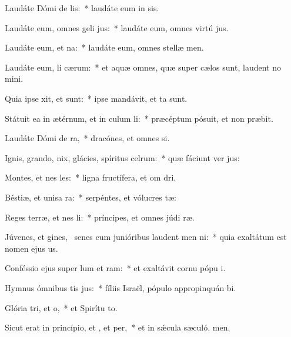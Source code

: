 \item Laudáte Dómi de lis:~* laudáte eum in sis.
\item Laudáte eum, omnes geli jus:~* laudáte eum, omnes virtú jus.
\item Laudáte eum,  et na:~* laudáte eum, omnes stellæ  men.
\item Laudáte eum, li cærum:~* et aquæ omnes, quæ super cælos sunt, laudent no mini.
\item Quia ipse xit, et  sunt:~* ipse mandávit, et ta sunt.
\item Státuit ea in ætérnum, et in culum li:~* præcéptum pósuit, et non præbit.
\item Laudáte Dómi de ra,~* dracónes, et omnes si.
\item Ignis, grando, nix, glácies, spíritus celrum:~* quæ fáciunt ver jus:
\item Montes, et nes les:~* ligna fructífera, et om dri.
\item Béstiæ, et unisa ra:~* serpéntes, et vólucres tæ:
\item Reges terræ, et nes li:~* príncipes, et omnes júdi ræ.
\item Júvenes, et gines,~\pscross{} senes cum junióribus laudent men ni:~* quia exaltátum est nomen ejus us.
\item Conféssio ejus super lum et ram:~* et exaltávit cornu pópu i.
\item Hymnus ómnibus tis jus:~* fíliis Israël, pópulo appropinquán bi.
\item Glória tri, et o,~* et Spirítu to.
\item Sicut erat in princípio, et , et per,~* et in sǽcula sæculó. men.

